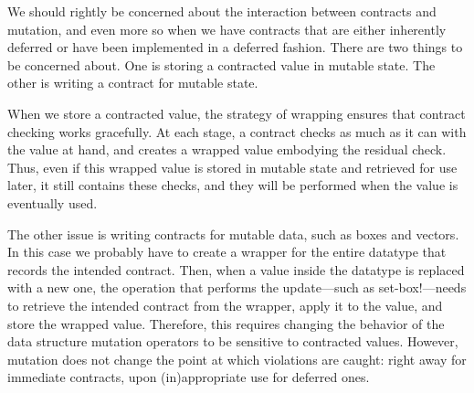 
We should rightly be concerned about the interaction between contracts and
mutation, and even more so when we have contracts that are either inherently
deferred or have been implemented in a deferred fashion. There are two things to
be concerned about. One is storing a contracted value in mutable state. The
other is writing a contract for mutable state.

When we store a contracted value, the strategy of wrapping ensures that contract
checking works gracefully. At each stage, a contract checks as much as it can
with the value at hand, and creates a wrapped value embodying the residual
check. Thus, even if this wrapped value is stored in mutable state and retrieved
for use later, it still contains these checks, and they will be performed when
the value is eventually used.

The other issue is writing contracts for mutable data, such as boxes and
vectors. In this case we probably have to create a wrapper for the entire
datatype that records the intended contract. Then, when a value inside the datatype is
replaced with a new one, the operation that performs the update—such as
set-box!—needs to retrieve the intended contract from the wrapper, apply it to
the value, and store the wrapped value. Therefore, this requires changing the
behavior of the data structure mutation operators to be sensitive to contracted
values. However, mutation does not change the point at which violations are
caught: right away for immediate contracts, upon (in)appropriate use for
deferred ones.
